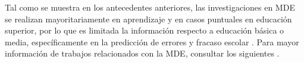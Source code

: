 






Tal como se muestra en los antecedentes anteriores, las investigaciones en MDE se realizan mayoritariamente en aprendizaje  y en casos puntuales en educación superior, por lo que es limitada la información respecto a educación básica o media, específicamente en la predicción de errores y fracaso escolar \parencite{marquez2013predicting}. Para mayor información de trabajos relacionados con la MDE, consultar los siguientes  \parencite{shahiri2015review,sukhija2015recent,anoopkumar2016review,dutt2017systematic}.